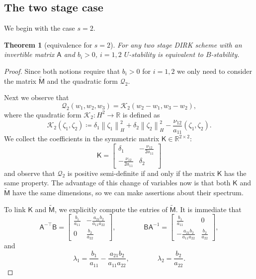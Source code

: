 \documentclass{amsart}
\newcommand{\nrm}[1]{\left\| #1 \right\|}
\newcommand{\Real}{\mathbb{R}}
\newcommand{\msfA}{\mathsf{A}}
\newcommand{\msfB}{\mathsf{B}}
\newcommand{\msfM}{\mathsf{M}}
\newcommand{\msfK}{\mathsf{K}}
\newcommand{\mclK}{\mathcal{K}}
\newcommand{\mclQ}{\mathcal{Q}}
\newtheorem{theorem}{Theorem}[section]
\theoremstyle{definition}
\begin{document}
\subsection{The two stage case}

We begin with the case $s=2$.

\begin{theorem}[equivalence for $s=2$]
  For any two stage DIRK scheme with an invertible matrix $\msfA$ and $b_i >0$, $i=1,2$ $U$-stability is equivalent to $B$-stability.
\end{theorem}
\begin{proof}
  Since both notions require that $b_i >0$ for $i=1,2$ we only need to consider the matrix $\tilde{\msfM}$ and the quadratic form $\mclQ_2$.

  Next we observe that
  \[
    \mclQ_2(w_1,w_2,w_3) = \mclK_2(w_2-w_1,w_3-w_2),
  \]
  where the quadratic form $\mclK_2 : H^2 \to \Real$ is defined as
  \[
    \mclK_2(\zeta_1,\zeta_2) \coloneqq \delta_1 \nrm{ \zeta_1}_H^2 + \delta_2 \nrm{ \zeta_2 }_H^2 - \frac{\nu_{12}}{a_{11}} \left( \zeta_1, \zeta_2 \right).
  \]
  We collect the coefficients in the symmetric matrix $\msfK \in \Real^{2 \times 2}$:
  \begin{equation*}
    \msfK =
    \begin{bmatrix}
    \delta_1 & -\frac{\nu_{12}}{2a_{11}} \\
    -\frac{\nu_{12}}{2a_{11}} & \delta_2
    \end{bmatrix}
  \end{equation*}
  and observe that $\mclQ_2$ is positive semi-definite if and only if the matrix $\msfK$ has the same property. The advantage of this change of variables now is that both $\msfK$ and $\tilde{\msfM}$ have the same dimensions, so we can make assertions about their spectrum.

  To link $\msfK$ and $\tilde{\msfM}$, we explicitly compute the entries of $\tilde{\msfM}$. It is immediate that
  \begin{equation*}
    \msfA^{-\top}\msfB =
    \begin{bmatrix}
      \frac{b_1}{a_{11}} & -\frac{a_{21}b_2}{a_{11}a_{22}} \\
      0 & \frac{b_2}{a_{22}}
    \end{bmatrix},
    \qquad \qquad
    \msfB\msfA^{-1} =
    \begin{bmatrix}
      \frac{b_1}{a_{11}} & 0 \\
      -\frac{a_{21}b_2}{a_{11}a_{22}} & \frac{b_2}{a_{22}}
    \end{bmatrix},
  \end{equation*}
  and
  \[
    \lambda_1 = \frac{b_1}{a_{11}} - \frac{a_{21}b_2}{a_{11}a_{22}}, \qquad \qquad \lambda_2 = \frac{b_2}{a_{22}}.
  \]


\end{proof}
\end{document}
